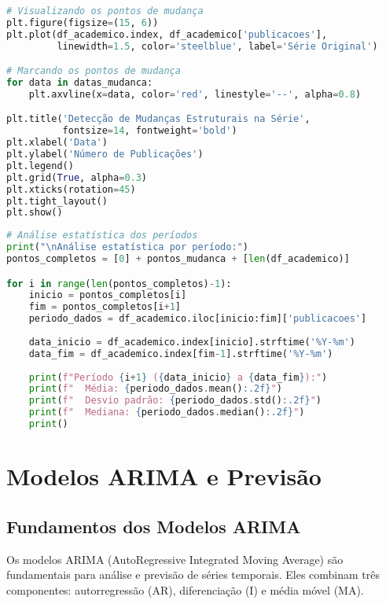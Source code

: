 \begin{pythonbox}
\begin{lstlisting}[language=Python]
# Visualizando os pontos de mudança
plt.figure(figsize=(15, 6))
plt.plot(df_academico.index, df_academico['publicacoes'], 
         linewidth=1.5, color='steelblue', label='Série Original')

# Marcando os pontos de mudança
for data in datas_mudanca:
    plt.axvline(x=data, color='red', linestyle='--', alpha=0.8)

plt.title('Detecção de Mudanças Estruturais na Série', 
          fontsize=14, fontweight='bold')
plt.xlabel('Data')
plt.ylabel('Número de Publicações')
plt.legend()
plt.grid(True, alpha=0.3)
plt.xticks(rotation=45)
plt.tight_layout()
plt.show()
\end{lstlisting}
\end{pythonbox}

\begin{pythonbox}
\begin{lstlisting}[language=Python]
# Análise estatística dos períodos
print("\nAnálise estatística por período:")
pontos_completos = [0] + pontos_mudanca + [len(df_academico)]

for i in range(len(pontos_completos)-1):
    inicio = pontos_completos[i]
    fim = pontos_completos[i+1]
    periodo_dados = df_academico.iloc[inicio:fim]['publicacoes']
    
    data_inicio = df_academico.index[inicio].strftime('%Y-%m')
    data_fim = df_academico.index[fim-1].strftime('%Y-%m')
    
    print(f"Período {i+1} ({data_inicio} a {data_fim}):")
    print(f"  Média: {periodo_dados.mean():.2f}")
    print(f"  Desvio padrão: {periodo_dados.std():.2f}")
    print(f"  Mediana: {periodo_dados.median():.2f}")
    print()
\end{lstlisting}
\end{pythonbox}

\section{Modelos ARIMA e Previsão}

\subsection{Fundamentos dos Modelos ARIMA}

Os modelos ARIMA (AutoRegressive Integrated Moving Average) são fundamentais para análise e previsão de séries temporais. Eles combinam três componentes: autorregressão (AR), diferenciação (I) e média móvel (MA).

